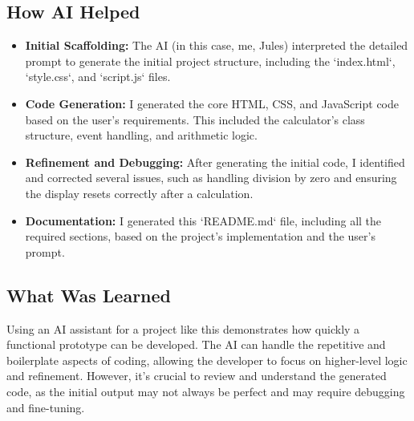 \documentclass{article}
\begin{document}
\subsection{How AI Helped}
\begin{itemize}
    \item \textbf{Initial Scaffolding:} The AI (in this case, me, Jules) interpreted the detailed prompt to generate the initial project structure, including the `index.html`, `style.css`, and `script.js` files.
    \item \textbf{Code Generation:} I generated the core HTML, CSS, and JavaScript code based on the user's requirements. This included the calculator's class structure, event handling, and arithmetic logic.
    \item \textbf{Refinement and Debugging:} After generating the initial code, I identified and corrected several issues, such as handling division by zero and ensuring the display resets correctly after a calculation.
    \item \textbf{Documentation:} I generated this `README.md` file, including all the required sections, based on the project's implementation and the user's prompt.
\end{itemize}

\subsection{What Was Learned}
Using an AI assistant for a project like this demonstrates how quickly a functional prototype can be developed. The AI can handle the repetitive and boilerplate aspects of coding, allowing the developer to focus on higher-level logic and refinement. However, it's crucial to review and understand the generated code, as the initial output may not always be perfect and may require debugging and fine-tuning.
\end{document}
